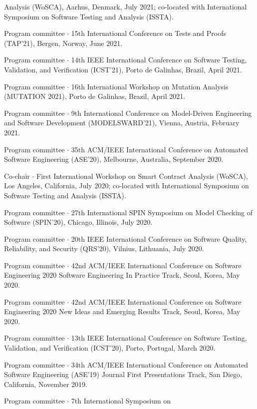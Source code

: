 \documentclass[ComputerScience]{vita}
\begin{document}
\begin{vita}
\begin{Panel and Committee Service}
  Analysis (WoSCA), Aarhus, Denmark, July 2021; co-located with 
  International Symposium on Software Testing and Analysis (ISSTA).
\item Program committee $\cdot$ 15th International Conference on Tests
  and Proofs (TAP'21), Bergen, Norway, June 2021.
\item Program committee $\cdot$ 14th IEEE International Conference on 
  Software Testing, Validation, and Verification (ICST'21), Porto de 
  Galinhas, Brazil, April 2021.
  \item Program committee $\cdot$ 16th International Workshop on
    Mutation Analysis (MUTATION 2021), Porto de 
  Galinhas, Brazil, April 2021.
\item Program committee $\cdot$ 9th International Conference on 
  Model-Driven Engineering and Software Development (MODELSWARD'21), Vienna, Austria, 
  February 2021.   
\item Program committee $\cdot$ 35th ACM/IEEE International Conference 
  on Automated Software Engineering (ASE'20), Melbourne, Australia, 
  September 2020.
\item Co-chair $\cdot$ First International Workshop on Smart Contract 
  Analysis (WoSCA), Los Angeles, California, July 2020; co-located with 
  International Symposium on Software Testing and Analysis (ISSTA).
\item Program committee $\cdot$ 27th International SPIN Symposium on
  Model Checking of Software (SPIN'20), Chicago, Illinois,
  July 2020.
  \item Program committee $\cdot$ 20th IEEE International Conference 
    on Software Quality, Reliability, and Security (QRS'20), Vilnius, 
    Lithuania, July 2020. 
  \item Program committee $\cdot$ 42nd ACM/IEEE International Conference on 
  Software Engineering 2020 Software Engineering In Practice Track, 
  Seoul, Korea, May 2020.
\item Program committee $\cdot$ 42nd ACM/IEEE International Conference on 
  Software Engineering 2020 New Ideas and Emerging Results Track, 
  Seoul, Korea, May 2020.
\item Program committee $\cdot$ 13th IEEE International Conference on
  Software Testing, Validation, and Verification (ICST'20), Porto,
  Portugal, March 2020.
\item Program committee $\cdot$ 34th ACM/IEEE International Conference on Automated Software Engineering (ASE'19) Journal First Presentations Track, San Diego, California, November 2019.
\item Program committee $\cdot$ 7th International Symposium on

\end{Panel and Committee Service}
\end{vita}
\end{document}
